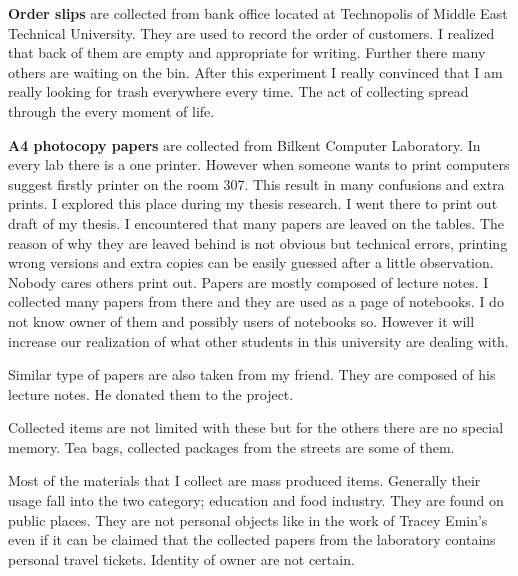 \textbf{Order slips} are collected from bank office located at Technopolis of Middle East Technical University. They are used to record the order of customers. I realized that back of them are empty and appropriate for writing. Further there many others are waiting on the bin. After this experiment I really convinced that I am really looking for trash everywhere every time. The act of collecting spread through the every moment of life. 

\textbf{A4 photocopy papers} are collected from Bilkent Computer Laboratory. In every lab there is a one printer. However when someone wants to print computers suggest firstly printer on the room 307. This result in many confusions and extra prints. I explored this place during my thesis research. I went there to print out draft of my thesis. I encountered that many papers are leaved on the tables.  The reason of why they are leaved behind is not obvious but technical errors, printing wrong versions and extra copies can be easily guessed after a little observation. Nobody cares others print out. Papers are mostly composed of lecture notes. I collected many papers from there and they are used as a page of notebooks. I do not know owner of them and possibly users of notebooks so. However it will increase our realization of what other students in this university are dealing with.

Similar type of papers are also taken from my friend. They are composed of his lecture notes. He donated them to the project.

Collected items are not limited with these but for the others there are no special memory. Tea bags, collected packages from the streets are some of them.

Most of the materials that I collect are mass produced items. Generally their usage fall into the two category; education and food industry. They are found on public places. They are not personal objects like in the work of Tracey Emin's  even if it can be claimed that the collected papers from the laboratory contains personal travel tickets. Identity of owner are not certain.



